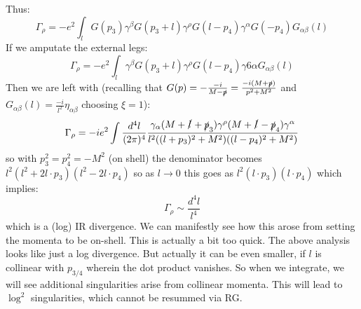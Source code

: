 Thus:
\begin{equation}
    \Gamma_\rho = -e^2\int_l G(p_3)\gamma^\beta G(p_3 + l)\gamma^\rho G(l - p_4)\gamma^\alpha G(-p_4)G_{\alpha\beta}(l)
\end{equation}
If we amputate the external legs:
\begin{equation}
    \Gamma_\rho = -e^2\int_l \gamma^\beta G(p_3 + l)\gamma^\rho G(l - p_4)\gamma6\alpha G_{\alpha\beta}(l)
\end{equation}
Then we are left with (recalling that $G(p) = -\frac{-i}{M - \slashed{p}} = \frac{-i(M + \slashed{p})}{p^2 + M^2}$ and $G_{\alpha\beta}(l) = \frac{-i}{l^2}\eta_{\alpha\beta}$ choosing $\xi = 1$):
\begin{equation}
    \Gamma_\rho = -ie^2\int \frac{d^4l}{(2\pi)^4}\frac{\gamma_\alpha(M + \slashed{l} + \slashed{p}_3)\gamma^\rho (M + \slashed{l} - \slashed{p}_4)\gamma^\alpha}{l^2((l + p_3)^2 + M^2)((l - p_4)^2 + M^2)}
\end{equation}
so with $p_3^2 = p_4^2 = -M^2$ (on shell) the denominator becomes $l^2(l^2 + 2l\cdot p_3)(l^2 - 2l\cdot p_4)$ so as $l \to 0$ this goes as $l^2(l\cdot p_3)(l \cdot p_4)$ which implies:
\begin{equation}
    \Gamma_\rho \sim \frac{d^4l}{l^4}
\end{equation}
which is a (log) IR divergence. We can manifestly see how this arose from setting the momenta to be on-shell. This is actually a bit too quick. The above analysis looks like just a log divergence. But actually it can be even smaller, if $l$ is collinear with $p_{3/4}$ wherein the dot product vanishes. So when we integrate, we will see additional singularities arise from collinear momenta. This will lead to $\log^2$ singularities, which cannot be resummed via RG.


